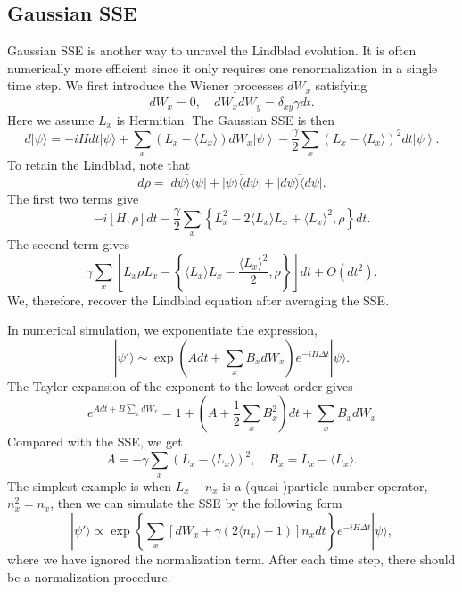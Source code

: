 \documentclass{SciPost}
\begin{document}
\subsection{Gaussian SSE}
Gaussian SSE is another way to unravel the Lindblad evolution.
It is often numerically more efficient since it only requires one renormalization in a single time step.
We first introduce the Wiener processes $dW_x$ satisfying 
\begin{equation}
	\overline{dW_x} = 0,\quad \overline{dW_x dW_y} = \delta_{xy} \gamma dt.
\end{equation}
Here we assume $L_x$ is Hermitian. The Gaussian SSE is then
\begin{equation}
	d |\psi\rangle = -i H dt |\psi\rangle + 
	\sum_x \left(L_x-\langle L_x\rangle \right) d W_x \left|\psi\right\rangle - \frac{\gamma}{2} \sum_x  (L_x - \langle L_x \rangle)^2 dt  \left|\psi\right\rangle.
\end{equation}
To retain the Lindblad, note that 
\begin{equation*}
	d\rho = \overline{|d\psi\rangle\langle\psi|} + \overline{|\psi\rangle \langle d\psi|}+ \overline{|d\psi\rangle\langle d\psi|}.
\end{equation*}
The first two terms give
\begin{equation*}
	-i[H,\rho]dt - \frac{\gamma}{2} \sum_x \left\{L_x^2- 2\langle L_x\rangle L_x + \langle L_x\rangle^2,\rho \right\}dt.
\end{equation*}
The second term gives
\begin{equation*}
	\gamma \sum_x \left[L_x \rho L_x  - \left\{\langle L_x\rangle L_x - \frac{\langle L_x\rangle^2}{2},\rho \right\}\right]dt + O(dt^2).
\end{equation*}
We, therefore, recover the Lindblad equation after averaging the SSE.

In numerical simulation, we exponentiate the expression, 
\begin{equation}
	|\psi'\rangle \sim \exp\left(A dt + \sum_x B_x dW_x \right) e^{-iH\Delta t}|\psi\rangle.
\end{equation}
The Taylor expansion of the exponent to the lowest order gives
\begin{equation*}
	e^{A dt + B \sum_x dW_x} = 1 + \left(A + \frac{1}{2} \sum_x B_x^2\right) dt + \sum_x B_x dW_x
\end{equation*}
Compared with the SSE, we get
\begin{equation*}
	A = -\gamma \sum_x (L_x-\langle L_x\rangle)^2,\quad
	B_x = L_x-\langle L_x\rangle.
\end{equation*}
The simplest example is when $L_x - n_x$ is a (quasi-)particle number operator, $n_x^2=n_x$, then we can simulate the SSE by the following form
\begin{equation}
	|\psi'\rangle \propto \exp\left\{\sum_x [dW_x + \gamma (2\langle n_x\rangle-1)]n_x dt \right\} e^{-iH\Delta t}|\psi\rangle,
\end{equation} 
where we have ignored the normalization term. After each time step, there should be a normalization procedure.
\end{document}
